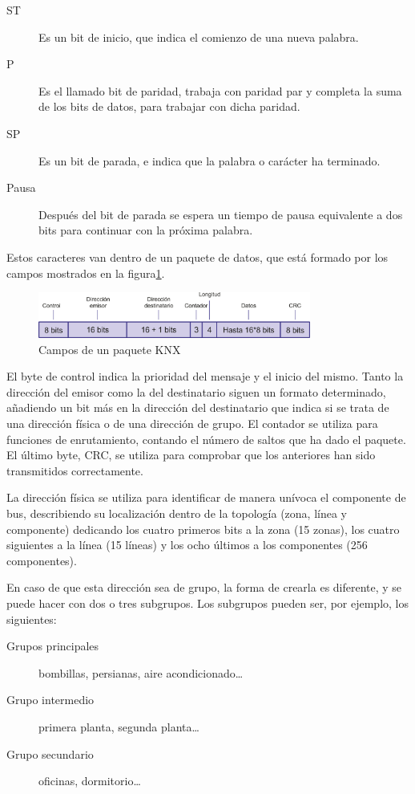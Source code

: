 \begin{description}
	\item[ST]Es un bit de inicio, que indica el comienzo de una nueva palabra.
	\item[P]Es el llamado bit de paridad, trabaja con paridad par y completa la suma de los bits de datos, para trabajar con dicha paridad.
	\item[SP]Es un bit de parada, e indica que la palabra o carácter ha terminado.
	\item[Pausa]Después del bit de parada se espera un tiempo de pausa equivalente a dos bits para continuar con la próxima palabra.
\end{description}

Estos caracteres van dentro de un paquete de datos, que está formado por los campos mostrados en la figura\ref{fig:campos_paq_knx}.
\begin{figure}
	\centering
		\includegraphics[width=0.80\textwidth]{imagenes/campos_paq_knx.png}
	\caption{Campos de un paquete KNX}
	\label{fig:campos_paq_knx}
\end{figure}


El byte de control indica la prioridad del mensaje y el inicio del mismo. Tanto la dirección del emisor como la del destinatario siguen un formato determinado, añadiendo un bit más en la dirección del destinatario que indica si se trata de una dirección física o de una dirección de grupo. El contador se utiliza para funciones de enrutamiento, contando el número de saltos que ha dado el paquete. El último byte, CRC, se utiliza para comprobar que los anteriores han sido transmitidos correctamente.


La dirección física se utiliza para identificar de manera unívoca el componente de bus, describiendo su localización dentro de la topología (zona, línea y componente) dedicando los cuatro primeros bits a la zona (15 zonas), los cuatro siguientes a la línea (15 líneas) y los ocho últimos a los componentes (256 componentes).


En caso de que esta dirección sea de grupo, la forma de crearla es diferente, y se puede hacer con dos o tres subgrupos. Los subgrupos pueden ser, por ejemplo, los siguientes:
\begin{description}
	\item[Grupos principales] bombillas, persianas, aire acondicionado…
	\item[Grupo intermedio] primera planta, segunda planta…
	\item[Grupo secundario] oficinas, dormitorio…
\end{description}


